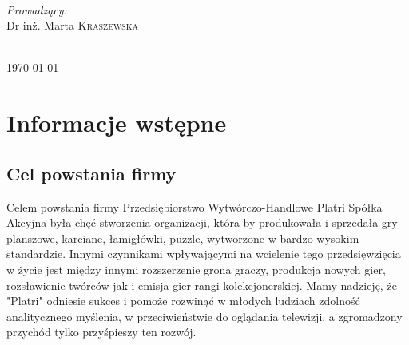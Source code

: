 \documentclass[a4paper, 11pt]{article}
\begin{document}
\begin{titlepage}
\begin{minipage}{0.4\textwidth}
\begin{flushleft}
\end{flushleft}
\end{minipage}
~
\begin{minipage}{0.4\textwidth}
\begin{flushright} \large
\emph{Prowadzący:}\\
 Dr inż. Marta \textsc{Kraszewska}  %
\end{flushright}
\end{minipage} \\[5cm]

		
		
		{\large \today}\\[3cm] %
		
		
		
		
		\vfill %
		
	\end{titlepage}
	
	
	\tableofcontents
	\vfill

	\newpage
	\section{Informacje wstępne}

	\subsection{Cel powstania firmy}
	\indent

Celem powstania firmy Przedsiębiorstwo Wytwórczo-Handlowe Platri Spółka Akcyjna była chęć stworzenia organizacji, która by produkowała i sprzedała gry planszowe, karciane, łamigłówki, puzzle, wytworzone w bardzo wysokim standardzie. Innymi czynnikami wpływającymi na wcielenie tego przedsięwzięcia w życie jest między innymi rozszerzenie grona graczy, produkcja nowych gier, rozsławienie twórców jak i emisja gier rangi kolekcjonerskiej. Mamy nadzieję, że "Platri" odniesie sukces i pomoże rozwinąć w młodych ludziach zdolność analitycznego myślenia, w przeciwieństwie do oglądania telewizji, a zgromadzony przychód tylko przyśpieszy ten rozwój.
\end{document}
